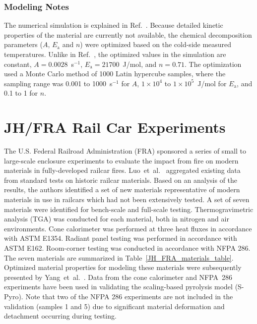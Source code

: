 \subsubsection{Modeling Notes}

The numerical simulation is explained in Ref.~\cite{Paudel:2021}. Because detailed kinetic properties of the material are currently not available, the chemical decomposition parameters ($A$, $E_{\textrm{a}}$ and $n$) were optimized based on the cold-side measured temperatures. Unlike in Ref.~\cite{Paudel:2021}, the optimized values in the simulation are constant, $A=0.0028$~s$^{-1}$, $E_{\textrm{a}}=21700$~J/mol, and $n=0.71$. The optimization used a Monte Carlo method of 1000 Latin hypercube samples, where the sampling range was 0.001 to 1000~s$^{-1}$ for $A$, $1\times10^4$ to $1\times10^5$~J/mol for $E_{\textrm{a}}$, and 0.1 to 1 for $n$.




\section{JH/FRA Rail Car Experiments}
\label{JH_FRA_Description}

The U.S. Federal Railroad Administration (FRA) sponsored a series of small to large-scale enclosure experiments to evaluate the impact from fire on modern materials in fully-developed railcar fires. Luo~et~al.~\cite{Luo:FRA2019} aggregated existing data from standard tests on historic railcar materials. Based on an analysis of the results, the authors identified a set of new materials representative of modern materials in use in railcars which had not been extensively tested. A set of seven materials were identified for bench-scale and full-scale testing. Thermogravimetric analysis (TGA) was conducted for each material, both in nitrogen and air environments. Cone calorimeter was performed at three heat fluxes in accordance with ASTM E1354. Radiant panel testing was performed in accordance with ASTM E162. Room-corner testing was conducted in accordance with NFPA 286. The seven materials are summarized in Table~\ref{JH_FRA_materials_table}. Optimized material properties for modeling these materials were subsequently presented by Yang~et~al.~\cite{Yang:FRA20}. Data from the cone calorimeter and NFPA~286 experiments have been used in validating the scaling-based pyrolysis model (S-Pyro). Note that two of the NFPA 286 experiments are not included in the validation (samples 1 and 5) due to significant material deformation and detachment occurring during testing.

